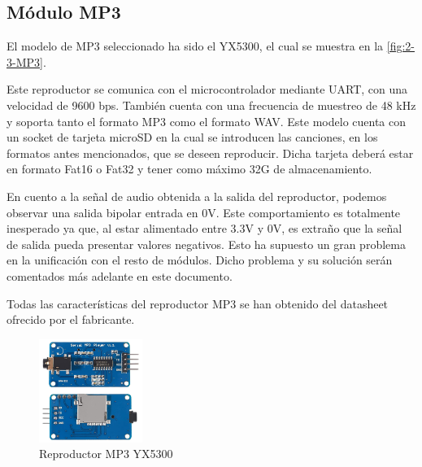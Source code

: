 \subsection{Módulo MP3}
El modelo de MP3 seleccionado ha sido el YX5300, el cual se muestra en la \autoref{fig:2-3-MP3}.

Este reproductor se comunica con el microcontrolador mediante UART, con una velocidad de 9600 bps. También cuenta con una frecuencia de muestreo de 48 kHz y soporta tanto el formato MP3 como el formato WAV. Este modelo cuenta con un socket de tarjeta microSD en la cual se introducen las canciones, en los formatos antes mencionados, que se deseen reproducir. Dicha tarjeta deberá estar en formato Fat16 o Fat32 y tener como máximo 32G de almacenamiento.

En cuento a la señal de audio obtenida a la salida del reproductor, podemos observar una salida bipolar entrada en 0V. Este comportamiento es totalmente inesperado ya que, al estar alimentado entre 3.3V y 0V, es extraño que la señal de salida pueda presentar valores negativos. Esto ha supuesto un gran problema en la unificación con el resto de módulos. Dicho problema y su solución serán comentados más adelante en este documento.

Todas las características del reproductor MP3 se han obtenido del datasheet ofrecido por el fabricante.

\begin{figure}[h]
    \centering
    \includegraphics[width=0.3\textwidth]{images/2/2-4/MP3.jpg}
    \caption{Reproductor MP3 YX5300}
    \label{fig:2-3-MP3}
\end{figure}